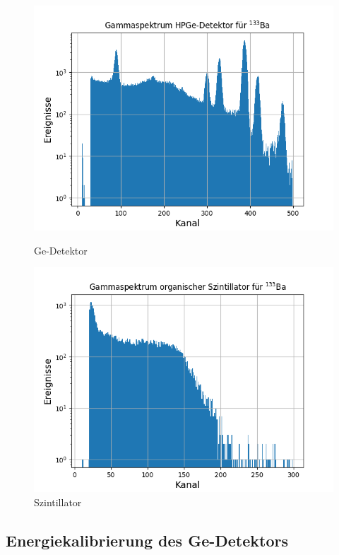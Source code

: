 \begin{figure}[h]
  \includegraphics[width=\linewidth]{images/ba133Ge.png}
  \caption{Ge-Detektor}
  \label{BaGe}
\endminipage\hfill
{}
  \includegraphics[width=\linewidth]{images/ba133Szin.png}
  \caption{Szintillator}
  \label{BaSzin}
\endminipage\hfill
\end{figure}

\subsection{Energiekalibrierung des Ge-Detektors}

